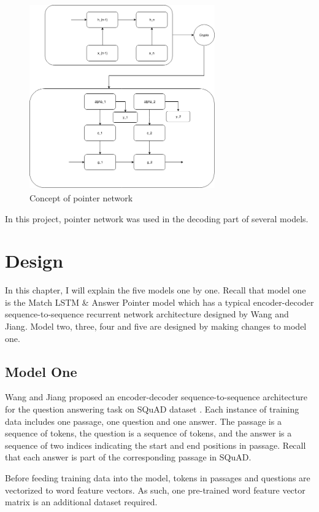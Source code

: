 \documentclass[modernstyle,12pt]{sjsuthesis}
\theoremstyle{definition}
\begin{document}
\begin{figure}[htbp]\centering
  \includegraphics[width=8cm, height=8cm]{figures/pointerNetwork.png}
  \caption{Concept of pointer network}
  \label{f:pointerNetwork}
\end{figure}

In this project, pointer network was used in the decoding part of several models.


\chapter{Design}\label{chap:design}

In this chapter, I will explain the five models one by one. Recall that model one is the Match LSTM \& Answer Pointer model which has a typical encoder-decoder sequence-to-sequence recurrent network architecture designed by Wang and Jiang\cite{wang2016machine}. Model two, three, four and five are designed by making changes to model one.


\section{Model One}

Wang and Jiang  proposed an encoder-decoder sequence-to-sequence architecture for the question answering task on SQuAD dataset \cite{wang2016machine}. Each instance of training data includes one passage, one question and one answer. The passage is a sequence of tokens, the question is a sequence of tokens, and the answer is a sequence of two indices indicating the start and end positions in passage. Recall that each answer is part of the corresponding passage in SQuAD.

Before feeding training data into the model, tokens in passages and questions are vectorized to word feature vectors. As such, one pre-trained word feature vector matrix is an additional dataset required.
\end{document}
